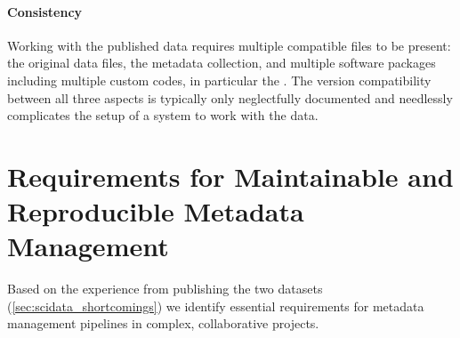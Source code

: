 \paragraph{Consistency} Working with the published data requires multiple compatible files to be present: the original data files, the metadata collection, and multiple software packages including multiple custom codes, in particular the . The version compatibility between all three aspects is typically only neglectfully documented and needlessly complicates the setup of a system to work with the data.



\section{Requirements for Maintainable and Reproducible Metadata Management}
\label{sec:metadata_requirements}
Based on the experience from publishing the two datasets (\cref{sec:scidata_shortcomings}) we identify essential requirements for metadata management pipelines in complex, collaborative projects.


